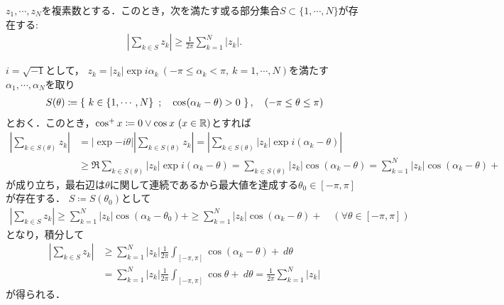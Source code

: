	\begin{screen}
		\begin{lem}\label{lem:total_variation_measure_bounded}
			$z_1,\cdots,z_N$を複素数とする．このとき，次を満たす或る部分集合$S \subset \{1,\cdots,N\}$が存在する:
			\begin{align}
				\left| \sum_{k \in S} z_k \right| \geq \frac{1}{2\pi} \sum_{k=1}^{N} |z_k|.
			\end{align}
		\end{lem}
	\end{screen}
	
	\begin{prf}
		$i = \sqrt{-1}$として，
		$z_k = |z_k|\exp{i \alpha_k}\ (-\pi \leq \alpha_k < \pi,\ k=1,\cdots,N)$を満たす$\alpha_1,\cdots,\alpha_N$を取り
		\begin{align}
			S(\theta) \coloneqq \Set{k \in \{1,\cdots,N\}}{\cos{(\alpha_k - \theta)}{} > 0},
			\quad (-\pi \leq \theta \leq \pi)
		\end{align}
		とおく．このとき，$\cos{x}{+} \coloneqq 0 \vee \cos{x}{}\ (x \in \R)$とすれば
		\begin{align}
			\left| \sum_{k \in S(\theta)} z_k \right| &= |\exp{-i\theta}|\left| \sum_{k \in S(\theta)} z_k \right| = \left| \sum_{k \in S(\theta)} |z_k|\exp{i(\alpha_k - \theta)} \right| \\
			&\geq \Re{\sum_{k \in S(\theta)} |z_k|\exp{i(\alpha_k - \theta)}} = \sum_{k \in S(\theta)} |z_k| \cos{(\alpha_k - \theta)}{} = \sum_{k=1}^{N} |z_k| \cos{(\alpha_k - \theta)}{+}
		\end{align}
		が成り立ち，最右辺は$\theta$に関して連続であるから最大値を達成する$\theta_0 \in [-\pi,\pi]$が存在する．
		$S \coloneqq S(\theta_0)$として
		\begin{align}
			\left| \sum_{k \in S} z_k \right| \geq \sum_{k=1}^{N} |z_k| \cos{(\alpha_k - \theta_0)}{+} \geq \sum_{k=1}^{N} |z_k| \cos{(\alpha_k - \theta)}{+}
			\quad (\forall \theta \in [-\pi, \pi])
		\end{align}
		となり，積分して
		\begin{align}
			\left| \sum_{k \in S} z_k \right| 
			&\geq \sum_{k=1}^{N} |z_k| \frac{1}{2\pi} \int_{[-\pi,\pi]} \cos{(\alpha_k - \theta)}{+}\ d\theta \\
			&= \sum_{k=1}^{N} |z_k| \frac{1}{2\pi} \int_{[-\pi,\pi]} \cos{\theta}{+}\ d\theta
			= \frac{1}{2\pi} \sum_{k=1}^{N} |z_k|
		\end{align}
		が得られる．
		\QED
	\end{prf}
	
